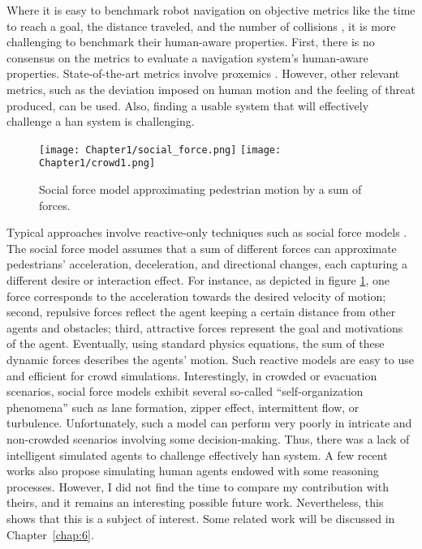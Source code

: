Where it is easy to benchmark robot navigation on objective metrics like the time to reach a goal, the distance traveled, and the number of collisions \cite{perille2020benchmarking}, it is more challenging to benchmark their human-aware properties.
First, there is no consensus on the metrics to evaluate a navigation system's human-aware properties. State-of-the-art metrics involve proxemics \cite{samarakoon2022review}. However, other relevant metrics, such as the deviation imposed on human motion and the feeling of threat produced, can be used.
Also, finding a usable system that will effectively challenge a \acrfull{han} system is challenging. 

\begin{figure}
    \center
    \texttt{[image: Chapter1/social\_force.png]}
    \texttt{[image: Chapter1/crowd1.png]}
    \caption{Social force model approximating pedestrian motion by a sum of forces.}
    \label{fig:social_force_model}
\end{figure}

Typical approaches involve reactive-only techniques such as social force models \cite{helbing1995social,chen_social_2018}. 
The social force model assumes that a sum of different forces can approximate pedestrians' acceleration, deceleration, and directional changes, each capturing a different desire or interaction effect. For instance, as depicted in figure \ref{fig:social_force_model}, one force corresponds to the acceleration towards the desired velocity of motion; second, repulsive forces reflect the agent keeping a certain distance from other agents and obstacles; third, attractive forces represent the goal and motivations of the agent. Eventually, using standard physics equations, the sum of these dynamic forces describes the agents' motion.
Such reactive models are easy to use and efficient for crowd simulations. Interestingly, in crowded or evacuation scenarios, social force models exhibit several so-called ``self-organization phenomena'' such as lane formation, zipper effect, intermittent flow, or turbulence.
Unfortunately, such a model can perform very poorly in intricate and non-crowded scenarios involving some decision-making. Thus, there was a lack of intelligent simulated agents to challenge effectively \acrshort{han} system.
A few recent works also propose simulating human agents endowed with some reasoning processes. However, I did not find the time to compare my contribution with theirs, and it remains an interesting possible future work. Nevertheless, this shows that this is a subject of interest. Some related work will be discussed in Chapter~\ref{chap:6}.
